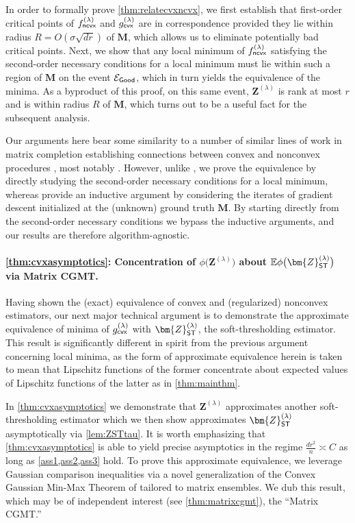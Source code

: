 \documentclass[10pt]{article}
\theoremstyle{definition}
\begin{document}
In order to formally prove \cref{thm:relatecvxncvx}, we first establish that first-order critical points  of $f^{(\lambda)}_{{\sf ncvx}}$ and $g^{(\lambda)}_{{\sf cvx}}$ are in correspondence provided they lie within radius $R = O(\sigma \sqrt{dr})$ of $\bm{M}$, which allows us to eliminate potentially bad critical points. Next, we show that any local minimum of $f^{(\lambda)}_{{\sf ncvx}}$  satisfying the second-order necessary conditions for a local minimum must lie within such a region of $\bm{M}$ on the event $\mathcal{E}_{{\sf Good}}$, which in turn yields the equivalence of the minima.   As a byproduct of this proof, on this same event, $\bm{Z}^{(\lambda)}$ is rank at most $r$ and is within radius $R$ of $\bm{M}$, which turns out to be a useful fact for the subsequent analysis.

Our arguments here bear some similarity to a number of similar lines of work in matrix completion  establishing connections between convex and nonconvex procedures \citep{yang_optimal_2023,chen_bridging_2021,chen_convex_2021,wang_robust_2025}, most notably \citet{chen_noisy_2020}.  However, unlike \citet{chen_noisy_2020}, we prove the equivalence by directly studying the second-order necessary conditions for a local minimum, whereas \citet{chen_noisy_2020} provide an inductive argument by considering the iterates of gradient descent initialized at the (unknown) ground truth $\bm{M}$.  By starting directly from the second-order necessary conditions we bypass the inductive arguments, and our results are therefore algorithm-agnostic. 

\paragraph{\cref{thm:cvxasymptotics}: Concentration of $\phi\big(\bm{Z}^{(\lambda)}\big)$ about $\mathbb{E}\phi\big(\bm{Z}_{{\sf ST}}^{(\lambda)}\big)$ via Matrix CGMT.} 
  Having shown the (exact) equivalence of convex and (regularized) nonconvex estimators, our next major technical argument is to demonstrate the approximate equivalence of minima of $g^{(\lambda)}_{{\sf cvx}}$ with $\bm{Z}_{{\sf ST}}^{(\lambda)}$, the soft-thresholding estimator.  This result is significantly different in spirit from the previous argument concerning local minima, as the form of approximate equivalence herein is taken to mean that Lipschitz functions of the former concentrate about expected values of Lipschitz functions of the latter  as in \cref{thm:mainthm}.  


In \cref{thm:cvxasymptotics} we demonstrate that $\bm{Z}^{(\lambda)}$ approximates another soft-thresholding estimator which we then show approximates $\bm{Z}^{(\lambda)}_{{\sf ST}}$ asymptotically via \cref{lem:ZSTtau}.
  It is worth emphasizing that \cref{thm:cvxasymptotics} is able to yield precise asymptotics in the regime $\frac{d r^2}{n}\asymp C$ as long as \cref{ass1,ass2,ass3} hold.    To prove this approximate equivalence, we leverage Gaussian comparison inequalities via a novel generalization of the Convex Gaussian Min-Max Theorem of \citet{thrampoulidis_gaussian_2015} tailored to matrix ensembles. We dub this result, which may be of independent interest (see \cref{thm:matrixcgmt}), the ``Matrix CGMT.'' 
\end{document}
